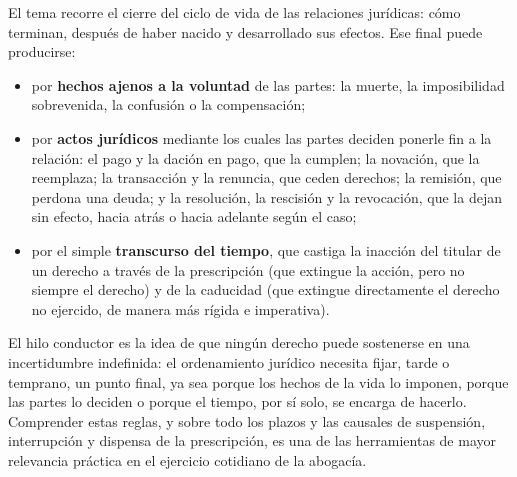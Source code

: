 \documentclass[12pt,oneside]{book}
\begin{document}
El tema recorre el cierre del ciclo de vida de las relaciones jurídicas: cómo terminan, después de haber nacido y desarrollado sus efectos. Ese final puede producirse:

\begin{itemize}
    \item por \textbf{hechos ajenos a la voluntad} de las partes: la muerte, la imposibilidad sobrevenida, la confusión o la compensación;
    \item por \textbf{actos jurídicos} mediante los cuales las partes deciden ponerle fin a la relación: el pago y la dación en pago, que la cumplen; la novación, que la reemplaza; la transacción y la renuncia, que ceden derechos; la remisión, que perdona una deuda; y la resolución, la rescisión y la revocación, que la dejan sin efecto, hacia atrás o hacia adelante según el caso;
    \item por el simple \textbf{transcurso del tiempo}, que castiga la inacción del titular de un derecho a través de la prescripción (que extingue la acción, pero no siempre el derecho) y de la caducidad (que extingue directamente el derecho no ejercido, de manera más rígida e imperativa).
\end{itemize}

El hilo conductor es la idea de que ningún derecho puede sostenerse en una incertidumbre indefinida: el ordenamiento jurídico necesita fijar, tarde o temprano, un punto final, ya sea porque los hechos de la vida lo imponen, porque las partes lo deciden o porque el tiempo, por sí solo, se encarga de hacerlo. Comprender estas reglas, y sobre todo los plazos y las causales de suspensión, interrupción y dispensa de la prescripción, es una de las herramientas de mayor relevancia práctica en el ejercicio cotidiano de la abogacía.
\end{document}

